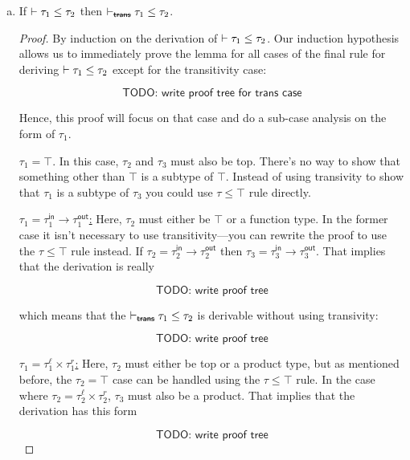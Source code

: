 \begin{enumerate}[(a)]
\item
    \begin{lemma} If $\vdash \tau_1 \leq \tau_2$ then $\subtypeNoTrans{\tau_1}{\tau_2}$. \end{lemma}

    \begin{proof} By induction on the derivation of $\vdash \tau_1 \leq \tau_2$. Our induction hypothesis allows us to
    immediately prove the lemma for all cases of the final rule for deriving $\vdash \tau_1 \leq \tau_2$ except for
    the transitivity case:

    $$\textsf{TODO: write proof tree for trans case}$$

    Hence, this proof will focus on that case and do a sub-case analysis on the form of $\tau_1$.

    \underline{$\tau_1 = \top$}. In this case, $\tau_2$ and $\tau_3$ must also be top. There's no way to show that
    something other than $\top$ is a subtype of $\top$. Instead of using transivity to show that $\tau_1$ is a subtype
    of $\tau_3$ you could use $\tau \leq \top$ rule directly.

    \underline{$\tau_1 = \tau^\textsf{in}_1 \rightarrow \tau^\textsf{out}_1$:} Here, $\tau_2$ must either be $\top$ or
    a function type. In the former case it isn't necessary to use transitivity---you can rewrite the proof to use
    the $\tau \leq \top$ rule instead. If $\tau_2 = \tau^\textsf{in}_2 \rightarrow \tau^\textsf{out}_2$ then
    $\tau_3 = \tau^\textsf{in}_3 \rightarrow \tau^\textsf{out}_3$. That implies that the derivation is really

    $$\textsf{TODO: write proof tree}$$

    which means that the $\subtypeNoTrans{\tau_1}{\tau_2}$ is derivable without using transivity:

    $$\textsf{TODO: write proof tree}$$


    \underline{$\tau_1 = \tau^\ell_1 \times \tau^r_1$:} Here, $\tau_2$ must either be top or a product type, but
    as mentioned before, the $\tau_2 = \top$ case can be handled using the $\tau \leq \top$ rule. In the case where
    $\tau_2 = \tau^\ell_2 \times \tau^r_2$, $\tau_3$ must also be a product. That implies that the derivation has
    this form

    $$\textsf{TODO: write proof tree}$$


\end{proof}
\end{enumerate}
